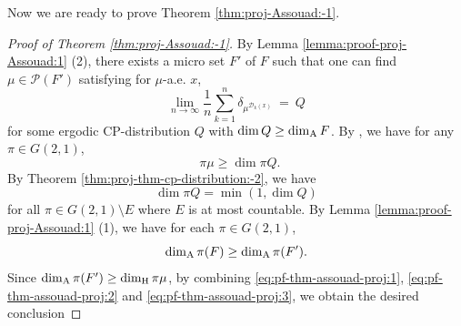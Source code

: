 \documentclass[a4paper,11pt]{amsart}
\theoremstyle{definition}
\numberwithin{equation}{section}
\def\to{\rightarrow}
\def\D{\mathcal{D}}
\def\cP{\mathcal P}
\DeclareMathOperator{\dimH}{dim_H}
\begin{document}
Now we are ready to prove Theorem \ref{thm:proj-Assouad:-1}.
\begin{proof}[Proof of Theorem \ref{thm:proj-Assouad:-1}]
By Lemma \ref{lemma:proof-proj-Assouad:1} (2), there exists a micro set $F'$ of $F$ such that one can find $\mu\in \cP(F')$ satisfying for $\mu$-a.e.  $x$,  
\[\lim_{n\to\infty} \frac{1}{n}\sum_{k=1}^n\delta_{\mu^{\D_k(x)}}  \ = \  Q \]
for some ergodic CP-distribution $Q$ with $\dim Q\ge \dim_{\rm A} F$. By \cite[Theorem 8.1]{HS2012},  we have for any $\pi\in G(2,1)$, 
\begin{equation}\label{eq:pf-thm-assouad-proj:1}
\dimH \pi\mu\ge \dim \pi Q.
\end{equation}
By Theorem \ref{thm:proj-thm-cp-distribution:-2},  we have 
\begin{equation}\label{eq:pf-thm-assouad-proj:2}
\dim \pi Q = \min(1,\dim Q)
\end{equation}
for all $\pi\in G(2,1)\setminus E$ where $E$ is at most countable.  By Lemma \ref{lemma:proof-proj-Assouad:1} (1),  we have for each $\pi\in G(2,1)$,
\begin{equation}\label{eq:pf-thm-assouad-proj:3}
\dim_{\rm A}\pi(F) \ge \dim_{\rm A}\pi(F').
\end{equation}
Since $\dim_{\rm A}\pi(F')\ge \dimH \pi\mu$,   by combining \eqref{eq:pf-thm-assouad-proj:1}, \eqref{eq:pf-thm-assouad-proj:2} and \eqref{eq:pf-thm-assouad-proj:3},   we obtain the desired conclusion

\end{proof} 
\end{document}
